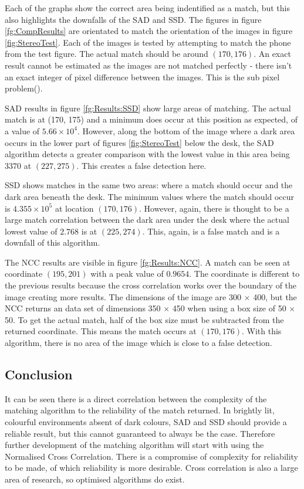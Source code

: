 Each of the graphs show the correct area being indentified as a match, but this also highlights the downfalls of the SAD and SSD. The figures in figure \ref{fg:CompResults} are orientated to match the orientation of the images in figure \ref{fig:StereoTest}. Each of the images is tested by attempting to match the phone from the test figure. The actual match should be around $(170, 176)$. An exact result cannot be estimated as the images are not matched perfectly - there isn't an exact integer of pixel difference between the images. This is the sub pixel problem(\cite{haller2012design}).

SAD results in figure \ref{fg:Results:SSD} show large areas of matching. The actual match is at (170, 175) and a minimum does occur at this position as expected, of a value of $5.66\times 10^4$. However, along the bottom of the image where a dark area occurs in the lower part of figures \ref{fig:StereoTest} below the desk, the SAD algorithm detects a greater comparison with the lowest value in this area being $3370$ at $(227, 275)$. This creates a false detection here. 

SSD shows matches in the same two areas: where a match should occur and the dark area beneath the desk. The minimum values where the match should occur is $4.355 \times 10^5$ at location $(170,176)$. However, again, there is thought to be a large match correlation between the dark area under the desk where the actual lowest value of $2.768$ is at $(225,274)$. This, again, is a false match and is a downfall of this algorithm. 

The NCC results are visible in figure \ref{fg:Results:NCC}. A match can be seen at coordinate $(195,201)$ with a peak value of $0.9654$. The coordinate is different to the previous results because the cross correlation works over the boundary of the image creating more results. The dimensions of the image are 300 $\times$ 400, but the NCC returns an data set of dimensions 350 $\times$ 450 when using a box size of 50 $\times$ 50. To get the actual match, half of the box size must be subtracted from the returned coordinate. This means the match occurs at $(170,176)$. With this algorithm, there is no area of the image which is close to a false detection. 

\subsection{Conclusion}
It can be seen there is a direct correlation between the complexity of the matching algorithm to the reliability of the match returned. In brightly lit, colourful environments absent of dark colours, SAD and SSD should provide a reliable result, but this cannot guaranteed to always be the case. Therefore further development of the matching algorithm will start with using the Normalised Cross Correlation. There is a compromise of complexity for reliability to be made, of which reliability is more desirable. Cross correlation is also a large area of research, so optimised algorithms do exist.

